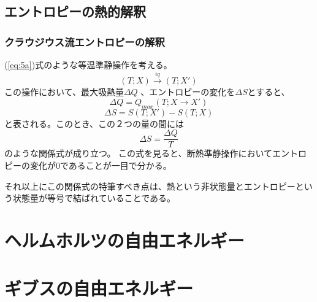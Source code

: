 \documentclass[a4paper]{jsreport}
\begin{document}
        \section{エントロピーの熱的解釈}
            \subsection*{クラウジウス流エントロピーの解釈}
                (\ref{eq:5a})式のような等温準静操作を考える。
                \begin{equation} \label{eq:5a}
                    (T; X) \xrightarrow{iq} (T; X')
                \end{equation}
                この操作において、最大吸熱量$\Delta Q$ 、エントロピーの変化を$\Delta S$とすると、
                \begin{equation}
                    \Delta Q = Q_{max}(T; X \xrightarrow{} X')
                \end{equation}
                \begin{equation}
                    \Delta S = S(T; X') - S(T; X)
                \end{equation}
                と表される。このとき、この２つの量の間には
                \begin{equation}
                    \Delta S = \frac{\Delta Q}{T}
                \end{equation}
                のような関係式が成り立つ。
                この式を見ると、断熱準静操作においてエントロピーの変化が$0$であることが一目で分かる。\par
                それ以上にこの関係式の特筆すべき点は、熱という非状態量とエントロピーという状態量が等号で結ばれていることである。

    
    \chapter{ヘルムホルツの自由エネルギー}
    
    
    \chapter{ギブスの自由エネルギー}
        
\end{document}
